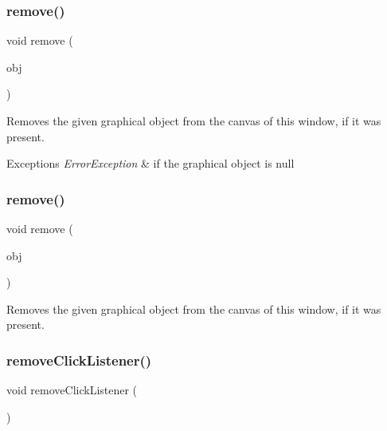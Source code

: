 \subsubsection{\texorpdfstring{remove()}{remove()}\hspace{0.1cm}{\footnotesize\ttfamily [3/4]}}
{\footnotesize\ttfamily void remove (\begin{DoxyParamCaption}\item[{\mbox{\hyperlink{classsgl_1_1GObject}{G\+Object}} $\ast$}]{obj }\end{DoxyParamCaption})\hspace{0.3cm}{\ttfamily [virtual]}}



Removes the given graphical object from the canvas of this window, if it was present. 


\begin{DoxyExceptions}{Exceptions}
{\em Error\+Exception} & if the graphical object is null \\
\hline
\end{DoxyExceptions}
\mbox{\label{classsgl_1_1GWindow_a37cf4a26853ac22c5e3a21335dfc7ac9}} 
\subsubsection{\texorpdfstring{remove()}{remove()}\hspace{0.1cm}{\footnotesize\ttfamily [4/4]}}
{\footnotesize\ttfamily void remove (\begin{DoxyParamCaption}\item[{\mbox{\hyperlink{classsgl_1_1GObject}{G\+Object}} \&}]{obj }\end{DoxyParamCaption})\hspace{0.3cm}{\ttfamily [virtual]}}



Removes the given graphical object from the canvas of this window, if it was present. 

\mbox{\label{classsgl_1_1GWindow_ad39d0325cde6b97ebda4b9d7787c633b}} 
\subsubsection{\texorpdfstring{remove\+Click\+Listener()}{removeClickListener()}}
{\footnotesize\ttfamily void remove\+Click\+Listener (\begin{DoxyParamCaption}{ }\end{DoxyParamCaption})\hspace{0.3cm}{\ttfamily [virtual]}}



